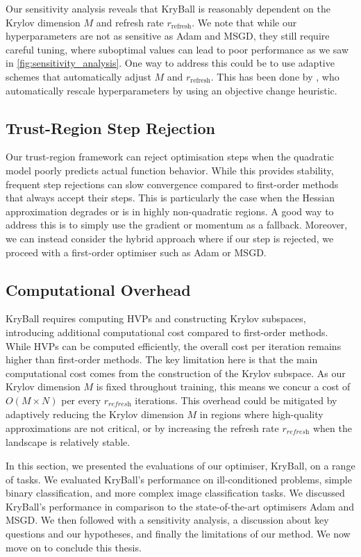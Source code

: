 Our sensitivity analysis reveals that KryBall is reasonably dependent on the Krylov dimension $M$ and refresh rate $r_{\text{refresh}}$. We note that while our hyperparameters are not as sensitive as Adam and MSGD, they still require careful tuning, where suboptimal values can lead to poor performance as we saw in \cref{fig:sensitivity_analysis}. One way to address this could be to use adaptive schemes that automatically adjust $M$ and $r_{\text{refresh}}$. This has been done by \cite{henriques2019small}, who automatically rescale hyperparameters by using an objective change heuristic.

\subsection{Trust-Region Step Rejection}
\label{ssec:trust_region_step_rejection}

Our trust-region framework can reject optimisation steps when the quadratic model poorly predicts actual function behavior. While this provides stability, frequent step rejections can slow convergence compared to first-order methods that always accept their steps. This is particularly the case when the Hessian approximation degrades or is in highly non-quadratic regions. A good way to address this is to simply use the gradient or momentum as a fallback. Moreover, we can instead consider the hybrid approach where if our step is rejected, we proceed with a first-order optimiser such as Adam or MSGD.

\subsection{Computational Overhead}
\label{ssec:computational_overhead}

KryBall requires computing HVPs and constructing Krylov subspaces, introducing additional computational cost compared to first-order methods. While HVPs can be computed efficiently, the overall cost per iteration remains higher than first-order methods. The key limitation here is that the main computational cost comes from the construction of the Krylov subspace. As our Krylov dimension $M$ is fixed throughout training, this means we concur a cost of $O(M \times N)$ per every $r_{\textit{refresh}}$ iterations. This overhead could be mitigated by adaptively reducing the Krylov dimension $M$ in regions where high-quality approximations are not critical, or by increasing the refresh rate $r_{\textit{refresh}}$ when the landscape is relatively stable. 

In this section, we presented the evaluations of our optimiser, KryBall, on a range of tasks. We evaluated KryBall's performance on ill-conditioned problems, simple binary classification, and more complex image classification tasks. We discussed KryBall's performance in comparison to the state-of-the-art optimisers Adam and MSGD. We then followed with a sensitivity analysis, a discussion about key questions and our hypotheses, and finally the limitations of our method. We now move on to conclude this thesis.